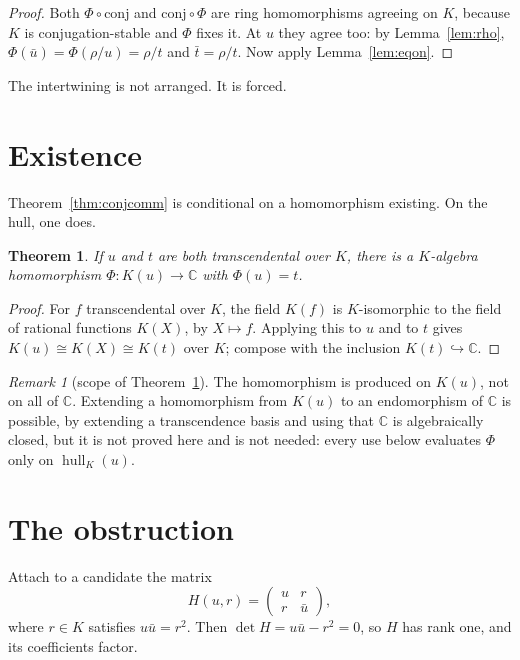 \documentclass[11pt]{article}
\newtheorem{theorem}{Theorem}[section]
\theoremstyle{definition}
\theoremstyle{remark}
\newtheorem*{remark}{Remark}
\newcommand{\C}{\mathbb{C}}
\newcommand{\hull}{\operatorname{hull}}
\begin{document}
\begin{proof}
Both $\Phi\circ{}$conj and conj${}\circ\Phi$ are ring homomorphisms agreeing on
$K$, because $K$ is conjugation-stable and $\Phi$ fixes it. At $u$ they agree
too: by Lemma~\ref{lem:rho}, $\Phi(\bar u)=\Phi(\rho/u)=\rho/t$ and
$\bar t=\rho/t$. Now apply Lemma~\ref{lem:eqon}.
\end{proof}

The intertwining is not arranged. It is forced.

\section{Existence}

Theorem~\ref{thm:conjcomm} is conditional on a homomorphism existing. On the
hull, one does.

\begin{theorem}\label{thm:exists}
If $u$ and $t$ are both transcendental over $K$, there is a $K$-algebra
homomorphism $\Phi\colon K(u)\to\C$ with $\Phi(u)=t$.
\end{theorem}

\begin{proof}
For $f$ transcendental over $K$, the field $K(f)$ is $K$-isomorphic to the field
of rational functions $K(X)$, by $X\mapsto f$. Applying this to $u$ and to $t$
gives $K(u)\cong K(X)\cong K(t)$ over $K$; compose with the inclusion
$K(t)\hookrightarrow\C$.
\end{proof}

\begin{remark}[scope of Theorem~\ref{thm:exists}]
The homomorphism is produced on $K(u)$, not on all of $\C$. Extending a
homomorphism from $K(u)$ to an endomorphism of $\C$ is possible, by extending a
transcendence basis and using that $\C$ is algebraically closed, but it is not
proved here and is not needed: every use below evaluates $\Phi$ only on
$\hull_K(u)$.
\end{remark}

\section{The obstruction}

Attach to a candidate the matrix
\[
  H(u,r)=\begin{pmatrix} u & r\\ r & \bar u\end{pmatrix},
\]
where $r\in K$ satisfies $u\bar u=r^{2}$. Then $\det H=u\bar u-r^{2}=0$, so $H$
has rank one, and its coefficients factor.
\end{document}
